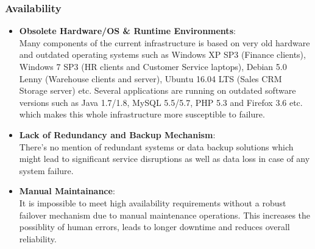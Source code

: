 \documentclass{llncs}
\begin{document}
\subsubsection*{Availability}
\begin{itemize}
  \item \textbf{Obsolete Hardware/OS \& Runtime Environments}:
        \\
        Many components of the current infrastructure is based on very old hardware and outdated operating systems such as 
        Windows XP SP3 (Finance clients), Windows 7 SP3 (HR clients and Customer Service laptops), Debian 5.0 Lenny (Warehouse clients and server),
        Ubuntu 16.04 LTS (Sales CRM Storage server) etc. Several applications are running on outdated software versions such as Java 1.7/1.8, 
        MySQL 5.5/5.7, PHP 5.3 and Firefox 3.6 etc. which makes this whole infrastructure more susceptible to failure.
        \\
  \item \textbf{Lack of Redundancy and Backup Mechanism}:
        \\ 
        There's no mention of redundant systems or data backup solutions which might lead to significant service disruptions as well as data loss in case of any system failure.
        \\
  \item \textbf{Manual Maintainance}:
        \\It is impossible to meet high availability requirements without a robust failover mechanism due to manual maintenance operations. 
        This increases the possiblity of human errors, leads to longer downtime and reduces overall reliability.
        \\
\end{itemize}
\end{document}

